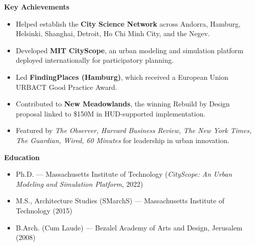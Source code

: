 \documentclass[a4paper,10pt]{article}
\begin{document}
\vspace{0.8em}

\noindent \textbf{Key Achievements}
\begin{itemize}[leftmargin=1.2em, itemsep=2pt, topsep=3pt]
      \item Helped establish the \textbf{City Science Network} across Andorra, Hamburg, Helsinki, Shanghai, Detroit, Ho Chi Minh City, and the Negev.
      \item Developed \textbf{MIT CityScope}, an urban modeling and simulation platform deployed internationally for participatory planning.
      \item Led \textbf{FindingPlaces (Hamburg)}, which received a European Union URBACT Good Practice Award.
      \item Contributed to \textbf{New Meadowlands}, the winning Rebuild by Design proposal linked to \$150M in HUD-supported implementation.
      \item Featured by \emph{The Observer, Harvard Business Review, The New York Times, The Guardian, Wired, 60 Minutes} for leadership in urban innovation.
\end{itemize}

\vspace{0.8em}

\noindent \textbf{Education}
\begin{itemize}[leftmargin=1.2em, itemsep=2pt, topsep=3pt]
      \item Ph.D. --- Massachusetts Institute of Technology (\textit{CityScope: An Urban Modeling and Simulation Platform}, 2022)
      \item M.S., Architecture Studies (SMarchS) --- Massachusetts Institute of Technology (2015)
      \item B.Arch. (Cum Laude) --- Bezalel Academy of Arts and Design, Jerusalem (2008)
\end{itemize}
\end{document}
